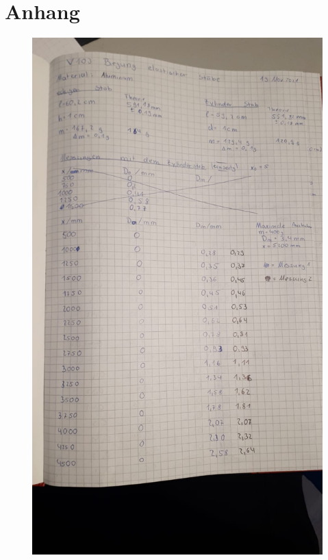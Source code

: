 \section{Anhang}
\label{sec:Anhang}

\begin{figure}[H]
    \centering
    \includegraphics{content/KladdeS1.jpeg}
\end{figure}
